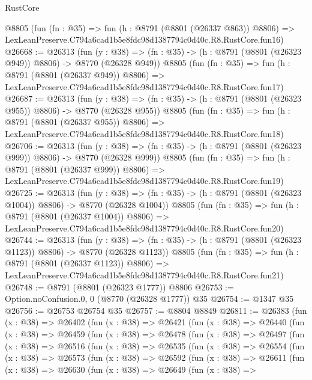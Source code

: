 \begin{lexlean}{RustCore}
\begin{coremodule}
    @8805
    (fun (fn : @35) =>
    fun (h : @8791 (@8801 (@26337 @863)) @8806) =>
    LexLeanPreserve.C794a6cad1b5e8fdc98d1387794c0d40c.R8.RustCore.fun16)
@26668 := @26313
    (fun (y : @38) => (fn : @35) -> (h : @8791 (@8801 (@26323 @949)) @8806) -> @8770 (@26328 @949))
    @8805
    (fun (fn : @35) =>
    fun (h : @8791 (@8801 (@26337 @949)) @8806) =>
    LexLeanPreserve.C794a6cad1b5e8fdc98d1387794c0d40c.R8.RustCore.fun17)
@26687 := @26313
    (fun (y : @38) => (fn : @35) -> (h : @8791 (@8801 (@26323 @955)) @8806) -> @8770 (@26328 @955))
    @8805
    (fun (fn : @35) =>
    fun (h : @8791 (@8801 (@26337 @955)) @8806) =>
    LexLeanPreserve.C794a6cad1b5e8fdc98d1387794c0d40c.R8.RustCore.fun18)
@26706 := @26313
    (fun (y : @38) => (fn : @35) -> (h : @8791 (@8801 (@26323 @999)) @8806) -> @8770 (@26328 @999))
    @8805
    (fun (fn : @35) =>
    fun (h : @8791 (@8801 (@26337 @999)) @8806) =>
    LexLeanPreserve.C794a6cad1b5e8fdc98d1387794c0d40c.R8.RustCore.fun19)
@26725 := @26313
    (fun (y : @38) =>
    (fn : @35) -> (h : @8791 (@8801 (@26323 @1004)) @8806) -> @8770 (@26328 @1004))
    @8805
    (fun (fn : @35) =>
    fun (h : @8791 (@8801 (@26337 @1004)) @8806) =>
    LexLeanPreserve.C794a6cad1b5e8fdc98d1387794c0d40c.R8.RustCore.fun20)
@26744 := @26313
    (fun (y : @38) =>
    (fn : @35) -> (h : @8791 (@8801 (@26323 @1123)) @8806) -> @8770 (@26328 @1123))
    @8805
    (fun (fn : @35) =>
    fun (h : @8791 (@8801 (@26337 @1123)) @8806) =>
    LexLeanPreserve.C794a6cad1b5e8fdc98d1387794c0d40c.R8.RustCore.fun21)
@26748 := @8791 (@8801 (@26323 @1777)) @8806
@26753 := Option.noConfusion.{0, 0} (@8770 (@26328 @1777)) @35
@26754 := @1347 @35
@26756 := @26753 @26754 @35
@26757 := @8804 @8849
@26811 := @26383
    (fun (x : @38) =>
    @26402
      (fun (x : @38) =>
      @26421
        (fun (x : @38) =>
        @26440
          (fun (x : @38) =>
          @26459
            (fun (x : @38) =>
            @26478
              (fun (x : @38) =>
              @26497
                (fun (x : @38) =>
                @26516
                  (fun (x : @38) =>
                  @26535
                    (fun (x : @38) =>
                    @26554
                      (fun (x : @38) =>
                      @26573
                        (fun (x : @38) =>
                        @26592
                          (fun (x : @38) =>
                          @26611
                            (fun (x : @38) =>
                            @26630
                              (fun (x : @38) =>
                              @26649
                                (fun (x : @38) =>

\end{coremodule}
\end{lexlean}
